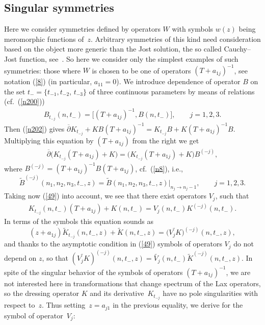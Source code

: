 \documentclass[pdftex]{sigma}
\numberwithin{equation}{section}
\begin{document}
\subsection{Singular symmetries}
Here we consider symmetries def\/ined by operators $W$ with symbols $w(z)$ being meromorphic functions of~$z$. Arbitrary symmetries of this kind need consideration based on the object more generic than the Jost solution, the so called Cauchy--Jost function, see~\cite{Boiti/Pempinelli/Pogrebkov,Grinevich/Orlov}. So here we consider only the simplest examples of such symmetries: those where $W$ is chosen to be one of operators $(T+a_{1j})^{-1}$, see notation (\ref{8}) (in particular, $a_{11}=0$). We introduce dependence of operator $B$ on the set $t_{-}=\{t_{-1}, t_{-2}$, $t_{-3}\}$ of three continuous parameters by means of relations (cf.~(\ref{n200}))
\begin{gather}
 B_{t_{-j}}(n,t_{-})=\big[(T+a_{1j})^{-1},B(n,t_{-})\big],\qquad j=1,2,3.\label{n35}
\end{gather}
Then (\ref{n202}) gives $\overline\partial{K}_{t_{-j}}+KB(T+a_{1j})^{-1}=K_{t_{-j}}B+K(T+a_{1j})^{-1}B$. Multiplying this equation by $(T+a_{1j})$ from
the right we get
\begin{gather*}
 \overline\partial\bigl(K_{t_{-j}}(T+a_{1j})+K\bigr)=\bigl(K_{t_{-j}}(T+a_{1j})+K\bigr)B^{(-j)},%
\end{gather*}
where $B^{(-j)}=(T+a_{1j})^{-1}B(T+a_{1j})$, cf.\ (\ref{n8}), i.e.,
\[
 \widetilde{B}^{(-j)}(n_1,n_2,n_3,t_{-},z)=\widetilde{B}(n_1,n_2,n_3,t_{-},z)\bigr|_{n_j\to n_j-1},\qquad j=1,2,3.
\]
Taking now (\ref{49}) into account, we see that there exist operators $V_{j}$, such that
\begin{gather}
 K_{t_{-j}}(n,t_{-})(T+a_{1j})+K(n,t_{-})=V_{j}(n,t_{-})K^{(-j)}(n,t_{-}).\label{n37}
\end{gather}
In terms of the symbols this equation sounds as
\[
(z+a_{1j})\widetilde{K}_{t_{-j}}(n,t_{-},z)+\widetilde{K}(n,t_{-},z)=\big(\widetilde{V_{j}K}\big)^{(-j)}(n,t_{-},z),
\]
and thanks to the asymptotic condition in (\ref{49}) symbols of operators $V_{j}$ do not depend on $z$, so that $(\widetilde{V_{j}K})^{(-j)}(n,t_{-},z)=\widetilde{V_{j}}(n,t_{-})\widetilde{K}^{(-j)}(n,t_{-},z)$. In spite of the singular behavior of the symbols of operators $(T+a_{1j})^{-1}$, we are not interested here in transformations that change spectrum of the Lax operators, so the dressing operator $K$ and its derivative~$K_{t_{-j}}$ have no pole singularities with respect to~$z$. Thus setting~$z=a_{j1}$ in the previous equality, we derive for the symbol of operator~$V_{j}$:
\end{document}

